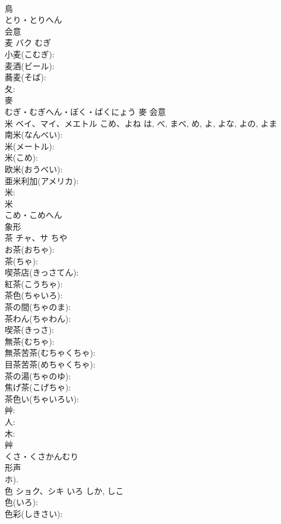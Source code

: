 \documentclass[8pt]{extreport}
\begin{document}
\begin{CJK}{UTF8}{min}
\\	鳥	
\\	とり・とりへん	
\\	会意 
\\	麦	バク	むぎ		
\\	小麦(こむぎ): 
\\	麦酒(ビール): 
\\	蕎麦(そば): 
\\	夂: 
\\	麥	
\\	むぎ・むぎへん・ぼく・ばくにょう	麥	会意 
\\	米	ベイ、マイ、メエトル	こめ、よね	は, べ, まべ, め, よ, よな, よの, よま	
\\	南米(なんべい): 
\\	米(メートル): 
\\	米(こめ): 
\\	欧米(おうべい): 
\\	亜米利加(アメリカ): 
\\	米: 
\\	米	
\\	こめ・こめへん	
\\	象形 
\\	茶	チャ、サ		ちや	
\\	お茶(おちゃ): 
\\	茶(ちゃ): 
\\	喫茶店(きっさてん): 
\\	紅茶(こうちゃ): 
\\	茶色(ちゃいろ): 
\\	茶の間(ちゃのま): 
\\	茶わん(ちゃわん): 
\\	喫茶(きっさ): 
\\	無茶(むちゃ): 
\\	無茶苦茶(むちゃくちゃ): 
\\	目茶苦茶(めちゃくちゃ): 
\\	茶の湯(ちゃのゆ): 
\\	焦げ茶(こげちゃ): 
\\	茶色い(ちゃいろい): 
\\	艸: 
\\	人: 
\\	木: 
\\	艸	
\\	くさ・くさかんむり	
\\	形声 
\\	ホ).
\\	色	ショク、シキ	いろ	しか, しこ	
\\	色(いろ): 
\\	色彩(しきさい): 

\end{CJK}
\end{document}
